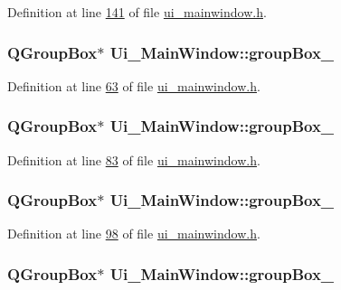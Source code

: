 Definition at line \hyperlink{a00139_source_l00141}{141} of file \hyperlink{a00139_source}{ui\+\_\+mainwindow.\+h}.

\hypertarget{a00080_a320d3d7ba1cb8fff7b7b95923ed10f5e}{
\subsubsection[{group\+Box\+\_\+3}]{\setlength{\rightskip}{0pt plus 5cm}Q\+Group\+Box$\ast$ Ui\+\_\+\+Main\+Window\+::group\+Box\+\_}}\label{a00080_a320d3d7ba1cb8fff7b7b95923ed10f5e}


Definition at line \hyperlink{a00139_source_l00063}{63} of file \hyperlink{a00139_source}{ui\+\_\+mainwindow.\+h}.

\hypertarget{a00080_ad8a919e5634add9c41bfc319cb9fd338}{
\subsubsection[{group\+Box\+\_\+4}]{\setlength{\rightskip}{0pt plus 5cm}Q\+Group\+Box$\ast$ Ui\+\_\+\+Main\+Window\+::group\+Box\+\_}}\label{a00080_ad8a919e5634add9c41bfc319cb9fd338}


Definition at line \hyperlink{a00139_source_l00083}{83} of file \hyperlink{a00139_source}{ui\+\_\+mainwindow.\+h}.

\hypertarget{a00080_a40a9931365fd3679efec4f0112073db2}{
\subsubsection[{group\+Box\+\_\+6}]{\setlength{\rightskip}{0pt plus 5cm}Q\+Group\+Box$\ast$ Ui\+\_\+\+Main\+Window\+::group\+Box\+\_}}\label{a00080_a40a9931365fd3679efec4f0112073db2}


Definition at line \hyperlink{a00139_source_l00098}{98} of file \hyperlink{a00139_source}{ui\+\_\+mainwindow.\+h}.

\hypertarget{a00080_a269faaef68e4ad4784635810fcae5698}{
\subsubsection[{group\+Box\+\_\+7}]{\setlength{\rightskip}{0pt plus 5cm}Q\+Group\+Box$\ast$ Ui\+\_\+\+Main\+Window\+::group\+Box\+\_}}\label{a00080_a269faaef68e4ad4784635810fcae5698}


